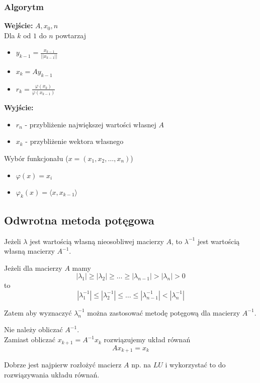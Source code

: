 \documentclass[../mn-notatki.tex]{subfiles}
\begin{document}
\subsubsection{Algorytm}
\begin{tcolorbox}
\textbf{Wejście:} $A, x_0, n$\\
Dla $k$ od $1$ do $n$ powtarzaj
\begin{itemize}
    \item $y_{k-1} = \frac{x_{k-1}}{||x_{k-1}||}$
    \item $x_k = A y_{k-1}$
    \item $r_k = \frac{\varphi(x_k)}{\varphi(x_{k-1})}$
\end{itemize}
\textbf{Wyjście:}
\begin{itemize}
    \item $r_n$ - przybliżenie największej wartości własnej $A$
    \item $x_k$ - przybliżenie wektora własnego
\end{itemize}
\vskip 0.3cm
Wybór funkcjonału ($x = (x_1, x_2, \ldots, x_n)$)
\begin{itemize}
    \item $\varphi(x) = x_i$
    \item $\varphi_k(x) = \langle x, x_{k-1} \rangle$
\end{itemize}

\end{tcolorbox}


\subsection{Odwrotna metoda potęgowa}
\begin{tcolorbox}
Jeżeli $\lambda$ jest wartością własną nieosobliwej macierzy $A$, to
$\lambda^{-1}$ jest wartością własną macierzy $A^{-1}$.
\end{tcolorbox}

Jeżeli dla macierzy $A$ mamy
\[
|\lambda_1| \geqslant |\lambda_2| \geqslant \ldots \geqslant
|\lambda_{n-1}|  > |\lambda_n| > 0
\]
to
\[
|\lambda_1^{-1}| \leqslant |\lambda_2^{-1}| \leqslant \ldots \leqslant
|\lambda_{n-1}^{-1}| < |\lambda_n^{-1}|
\]

Zatem aby wyznaczyć $\lambda_n^{-1}$ można zastosować metodę potęgową dla
macierzy $A^{-1}$.

\begin{tcolorbox}
Nie należy obliczać $A^{-1}$.\\

Zamiast obliczać $x_{k+1} = A^{-1} x_k$ rozwiązujemy układ równań
\[
Ax_{k+1} = x_k
\]

Dobrze jest najpierw rozłożyć macierz $A$ np. na $LU$ i wykorzystać to do
rozwiązywania układu równań.
\end{tcolorbox}
\end{document}
